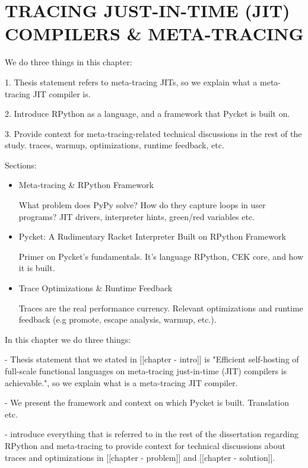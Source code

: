\chapter[\texorpdfstring{TRACING JUST-IN-TIME (JIT) COMPILERS \& META-TRACING}
                          {RPython \& Meta-tracing}]{TRACING JUST-IN-TIME (JIT) COMPILERS \& META-TRACING}
    \label{chapter:rpython}

    \begin{chaptersynopsis}

        We do three things in this chapter:

        1. Thesis statement refers to meta-tracing JITs, so we explain what a meta-tracing JIT compiler is.

        2. Introduce RPython as a language, and a framework that Pycket is built on.

        3. Provide context for meta-tracing-related technical discussions in the rest of the study. traces, warmup, optimizations, runtime feedback, etc.

        \vspace{2em}

        Sections:
		\begin{itemize}
			\item Meta-tracing \& RPython Framework

                What problem does PyPy solve? How do they capture loops in user programs? JIT drivers, interpreter hints, green/red variables etc.
			\item Pycket: A Rudimentary Racket Interpreter Built on RPython Framework

                Primer on Pycket's fundamentals. It's language RPython, CEK core, and how it is built.
			\item Trace Optimizations \& Runtime Feedback

                Traces are the real performance currency. Relevant optimizations and runtime feedback (e.g promote, escape analysis, warmup, etc.).
		\end{itemize}
    \end{chaptersynopsis}

    \begin{paragraph-here}
        In this chapter we do three things:

        - Thesis statement that we stated in [[chapter - intro]] is "Efficient self-hosting of full-scale functional languages on meta-tracing just-in-time (JIT) compilers is achievable.", so we explain what is a meta-tracing JIT compiler.

        - We present the framework and context on which Pycket is built. Translation etc.

        - introduce everything that is referred to in the rest of the dissertation regarding RPython and meta-tracing to provide context for technical discussions about traces and optimizations in [[chapter - problem]] and [[chapter - solution]].
    \end{paragraph-here}

